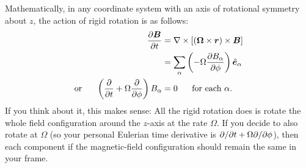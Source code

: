 \documentclass[12pt]{article}
\newcommand{\vecrot}{\bm{\Omega}}
\newcommand{\vecr}{\bm{r}}
\begin{document}
Mathematically, in any coordinate system with an axis of rotational symmetry about $z$, the action of rigid rotation is as follows:
\begin{align}
	\pderiv{\vecb}{t}&=\curl[(\vecrot\times\vecr)\times\vecb]\nonumber\\
	&= \sum_\alpha\left(-\Omega\pderiv{B_\alpha}{\phi}\right)\e_\alpha\nonumber\\
	\orr \left(\pderiv{}{t}+\Omega\pderiv{}{\phi}\right)B_\alpha&=0\five\text{for each $\alpha$}.
\end{align}
If you think about it, this makes sense: All the rigid rotation does is rotate the whole field configuration around the $z$-axis at the rate $\Omega$. If you decide to also rotate at $\Omega$ (so your personal Eulerian time derivative is $\partial/\partial t+\Omega\partial/\partial\phi$), then each component if the magnetic-field configuration should remain the same in your frame. 
\end{document}
